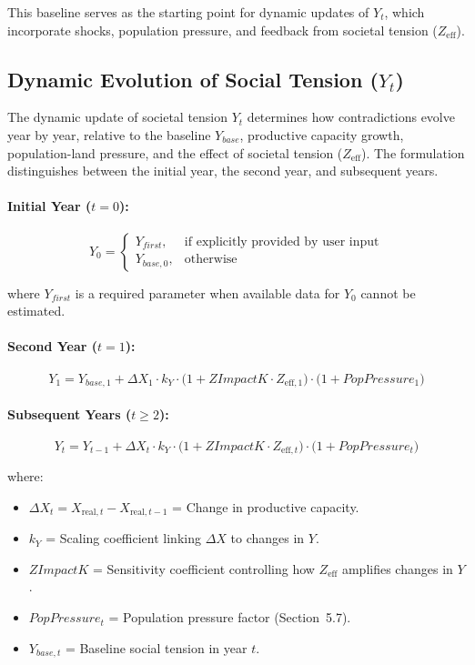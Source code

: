 \documentclass[12pt,a4paper]{article}
\begin{document}
\noindent This baseline serves as the starting point for dynamic updates of 
$Y_t$, which incorporate shocks, population pressure, and feedback from 
societal tension ($Z_{\mathrm{eff}}$).
\subsection{Dynamic Evolution of Social Tension (\texorpdfstring{$Y_t$}{Y\_t})}

The dynamic update of societal tension $Y_t$ determines how contradictions 
evolve year by year, relative to the baseline $Y_{base}$, productive capacity 
growth, population-land pressure, and the effect of societal tension 
($Z_{\mathrm{eff}}$). The formulation distinguishes between the initial year, 
the second year, and subsequent years.

\paragraph{Initial Year ($t = 0$):}
\begin{equation}
Y_0 =
\begin{cases}
Y_{first}, & \text{if explicitly provided by user input} \\
Y_{base,0}, & \text{otherwise}
\end{cases}
\end{equation}

\noindent where $Y_{first}$ is a required parameter when available data 
for $Y_0$ cannot be estimated.

\paragraph{Second Year ($t = 1$):}
\begin{equation}
Y_1 = Y_{base,1} + \Delta X_1 \cdot k_Y \cdot \big( 1 + ZImpactK \cdot Z_{\mathrm{eff},1} \big) \cdot \big( 1 + PopPressure_1 \big)
\end{equation}

\paragraph{Subsequent Years ($t \geq 2$):}
\begin{equation}\label{sec:Y}
Y_t = Y_{t-1} + \Delta X_t \cdot k_Y \cdot \big( 1 + ZImpactK \cdot Z_{\mathrm{eff},t} \big) \cdot \big( 1 + PopPressure_t \big)
\end{equation}

\noindent where:
\begin{itemize}
    \item $\Delta X_t = X_{\mathrm{real},t} - X_{\mathrm{real},t-1}$ = Change in productive capacity.
    \item $k_Y$ = Scaling coefficient linking $\Delta X$ to changes in $Y$.
    \item $ZImpactK$ = Sensitivity coefficient controlling how $Z_{\mathrm{eff}}$ amplifies changes in $Y$.
    \item $PopPressure_t$ = Population pressure factor (Section~5.7).
    \item $Y_{base,t}$ = Baseline social tension in year $t$.
\end{itemize}
\end{document}

